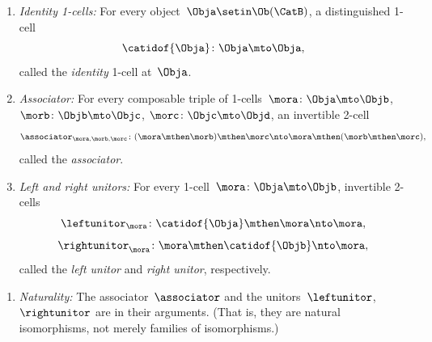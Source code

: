 \begin{ctdefinition}[Bicategory]
\begin{enumerate}
        \item \label{bicat-identities}
              \emph{Identity 1-cells:}
              For every object~$\Obja \setin \Ob(\CatB)$, a distinguished 1-cell
              \begin{equation}\label{eq:bicat-identity-cell}
                  \catidof{\Obja} \colon \Obja \mto \Obja,
              \end{equation}
              called the \emph{identity} 1-cell at~$\Obja$.

        \item \label{bicat-associator}
              \emph{Associator:}
              For every composable triple of 1-cells~$\mora\colon \Obja \mto \Objb$, $\morb\colon \Objb \mto \Objc$, $\morc\colon \Objc \mto \Objd$, an invertible 2-cell
              \begin{equation}\label{eq:bicat-associator}
                  \associator_{\mora,\morb,\morc} \colon (\mora \mthen \morb) \mthen \morc \nto \mora \mthen (\morb \mthen \morc),
              \end{equation}
              called the \emph{associator}.

        \item \label{bicat-unitors}
              \emph{Left and right unitors:}
              For every 1-cell~$\mora \colon \Obja \mto \Objb$, invertible 2-cells
              \begin{equation}\label{eq:bicat-left-unitor}
                  \leftunitor_\mora \colon \catidof{\Obja} \mthen \mora \nto \mora,
              \end{equation}
              \begin{equation}\label{eq:bicat-right-unitor}
                  \rightunitor_\mora \colon \mora \mthen \catidof{\Objb} \nto \mora,
              \end{equation}
              called the \emph{left unitor} and \emph{right unitor}, respectively.
    \end{enumerate}

    \condit

    \begin{enumerate}
        \item \label{bicat-naturality}
              \emph{Naturality:}
              The associator~$\associator$ and the unitors~$\leftunitor$,~$\rightunitor$ are  in their arguments.
              (That is, they are natural isomorphisms, not merely families of isomorphisms.)


\end{enumerate}
\end{ctdefinition}
